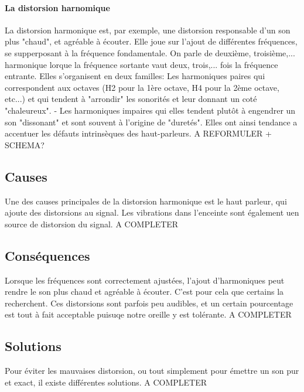 \documentclass{article}
\begin{document}
\paragraph{La distorsion harnomique}La distorsion harmonique est, par exemple, une distorsion responsable d'un son plus "chaud", et agréable à écouter. Elle joue sur l'ajout de différentes fréquences, se supperposant à la fréquence fondamentale. On parle de deuxième, troisième,... harmonique lorque la fréquence sortante vaut deux, trois,... fois la fréquence entrante. Elles s'organisent en deux familles: Les harmoniques paires qui correspondent aux octaves (H2 pour la 1ère octave, H4 pour la 2ème octave, etc...) et qui tendent à "arrondir" les sonorités et leur donnant un coté "chaleureux".
- Les harmoniques impaires qui elles tendent plutôt à engendrer un son "dissonant" et sont souvent à l'origine de "duretés". Elles ont ainsi tendance a accentuer les défauts intrinsèques des haut-parleurs.
A REFORMULER + SCHEMA?


\subsection{Causes}
Une des causes principales de la distorsion harmonique est le haut parleur, qui ajoute des distorsions au signal. Les vibrations dans l'enceinte sont également uen source de distorsion du signal. A COMPLETER



\subsection{Conséquences}
Lorsque les fréquences sont correctement ajustées, l'ajout d'harmoniques peut rendre le son plus chaud et agréable à écouter. C'est pour cela que certains la recherchent.
Ces distorsions sont parfois peu audibles, et un certain pourcentage est tout à fait acceptable puisuqe notre oreille y est tolérante.
A COMPLETER

\subsection{Solutions}
Pour éviter les mauvaises distorsion, ou tout simplement pour émettre un son pur et exact, il existe différentes solutions.
A COMPLETER





\end{document}
